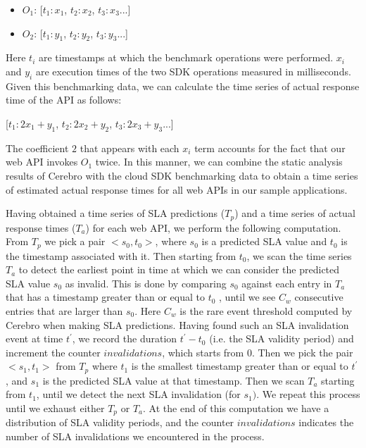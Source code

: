 \begin{itemize}
\item $O_{1}$: [$t_{1}:x_{1}$, $t_{2}:x_{2}$, $t_{3}:x_{3}$...]
\item $O_{2}$: [$t_{1}:y_{1}$, $t_{2}:y_{2}$, $t_{3}:y_{3}$...]
\end{itemize}

Here $t_{i}$ are timestamps at which the benchmark operations were performed. $x_{i}$ and $y_{i}$ are
execution times of the two SDK operations measured in milliseconds. Given this benchmarking data,
we can calculate the time series of actual response time of the API as follows:

[$t_{1}:2x_{1}+y_{1}$, $t_{2}:2x_{2}+y_{2}$, $t_{3}:2x_{3}+y_{3}$...]

The coefficient $2$ that appears with each $x_{i}$ term accounts for the fact that our web API
invokes $O_{1}$ twice. In this manner, we can combine the static analysis
results of Cerebro with the cloud SDK benchmarking data to obtain a time series of estimated
actual response times for all web APIs in our sample applications.

Having obtained a time series of SLA predictions ($T_{p}$) and a time series of actual response 
times ($T_{a}$) for each web API, we perform the following computation. From $T_{p}$ we pick a
pair $<s_{0},t_{0}>$, where $s_{0}$ is a predicted SLA value and $t_{0}$ is the timestamp associated with it. 
Then starting from $t_{0}$, we scan the time series $T_{a}$ to detect the earliest point in time
at which we can consider the predicted SLA value $s_{0}$ as invalid. This is done by comparing $s_{0}$
against each entry in $T_{a}$ that has a timestamp greater than or equal to $t_{0}$ , until we see $C_{w}$ 
consecutive entries that are larger than $s_{0}$. Here $C_{w}$ is the rare event threshold 
computed by Cerebro when making SLA predictions. Having found such an SLA invalidation
event at time $t^{\prime}$, we record the duration $t^{\prime} - t_{0}$ (i.e. the SLA validity period) and 
increment the counter $invalidations$, 
which starts from $0$. Then we pick the pair $<s_{1},t_{1}>$ from $T_{p}$ where $t_{1}$ is the smallest
timestamp greater than or equal to $t^{\prime}$, and $s_{1}$ is the predicted SLA value at that timestamp.
Then we scan $T_{a}$ starting from $t_{1}$, until we detect the next SLA invalidation (for $s_{1})$. 
We repeat this process
until we exhaust either $T_{p}$ or $T_{a}$. At the end of this computation we have a distribution of SLA
validity periods, and the counter $invalidations$ indicates the number of SLA invalidations we encountered
in the process.

